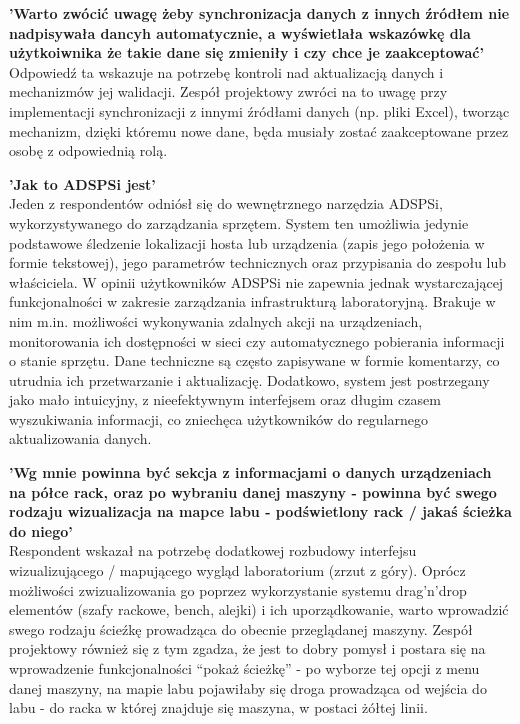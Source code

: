 \par\textbf{'Warto zwócić uwagę żeby synchronizacja danych z innych źródłem nie nadpisywała dancyh automatycznie, a wyświetlała wskazówkę dla użytkoiwnika że takie dane się zmieniły i czy chce je zaakceptować'}\\
Odpowiedź ta wskazuje na potrzebę kontroli nad aktualizacją danych i mechanizmów jej walidacji. Zespół projektowy zwróci na to uwagę przy implementacji synchronizacji z innymi źródłami danych (np. pliki Excel), tworząc mechanizm, dzięki któremu nowe dane, będa musiały zostać zaakceptowane przez osobę z odpowiednią rolą.\\
\par\textbf{'Jak to ADSPSi jest'}\\
Jeden z respondentów odniósł się do wewnętrznego narzędzia ADSPSi, wykorzystywanego do zarządzania sprzętem. System ten umożliwia jedynie podstawowe śledzenie lokalizacji hosta lub urządzenia (zapis jego położenia w formie tekstowej), jego parametrów technicznych oraz przypisania do zespołu lub właściciela. W opinii użytkowników ADSPSi nie zapewnia jednak wystarczającej funkcjonalności w zakresie zarządzania infrastrukturą laboratoryjną. Brakuje w nim m.in. możliwości wykonywania zdalnych akcji na urządzeniach, monitorowania ich dostępności w sieci czy automatycznego pobierania informacji o stanie sprzętu. Dane techniczne są często zapisywane w formie komentarzy, co utrudnia ich przetwarzanie i aktualizację. Dodatkowo, system jest postrzegany jako mało intuicyjny, z nieefektywnym interfejsem oraz długim czasem wyszukiwania informacji, co zniechęca użytkowników do regularnego aktualizowania danych.\\
\par\textbf{'Wg mnie powinna być sekcja z informacjami o danych urządzeniach na półce \gls{rack}, oraz po wybraniu danej maszyny - powinna być swego rodzaju wizualizacja na mapce labu - podświetlony \gls{rack} / jakaś ścieżka do niego'}\\
Respondent wskazał na potrzebę dodatkowej rozbudowy interfejsu wizualizującego / mapującego wygląd \gls{laboratorium} (zrzut z góry). Oprócz możliwości zwizualizowania go poprzez wykorzystanie systemu drag’n’drop elementów (szafy \gls{rack}owe, bench, alejki) i ich uporządkowanie, warto wprowadzić swego rodzaju ścieźkę prowadząca do obecnie przeglądanej maszyny. Zespół projektowy również się z tym zgadza, że jest to dobry pomysł i postara się na wprowadzenie funkcjonalności “pokaż ścieżkę” - po wyborze tej opcji z menu danej maszyny, na mapie labu pojawiłaby się droga prowadząca od wejścia do labu - do \gls{rack}a w której znajduje się maszyna, w postaci żółtej linii.

